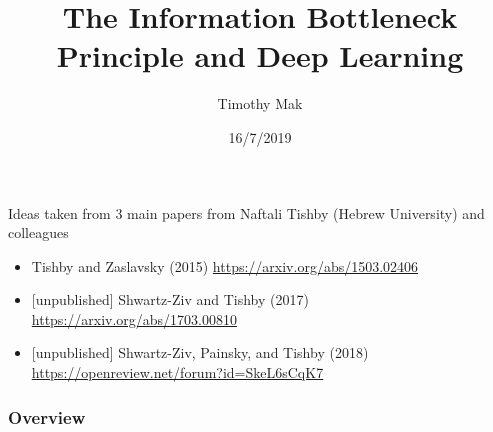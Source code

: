\documentclass{beamer}
\title[]{The Information Bottleneck Principle and Deep Learning} %
\author{Timothy Mak} %
\institute[Fano Labs] %
{
	Fano Labs, Hong Kong \\ %
	\medskip
}
\date{16/7/2019} %
\begin{document}
	
	\begin{frame}
	\titlepage %
	\end{frame}

\begin{frame}
Ideas taken from 3 main papers from Naftali Tishby (Hebrew University) and colleagues 
\begin{itemize}
	\item Tishby and Zaslavsky (2015) \url{https://arxiv.org/abs/1503.02406}
	\item{} [unpublished] Shwartz-Ziv and Tishby (2017) \url{https://arxiv.org/abs/1703.00810}
	\item{} [unpublished] Shwartz-Ziv, Painsky, and Tishby (2018) \url{https://openreview.net/forum?id=SkeL6sCqK7}
\end{itemize}

\end{frame}


\begin{frame}
\frametitle{Overview} %
\tableofcontents %
\end{frame}


\end{document}

